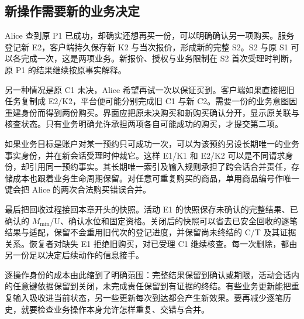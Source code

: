 
\subsection*{新操作需要新的业务决定}

Alice 查到原 P1 已成功，却确实还想再买一份，可以明确确认另一项购买。服务登记新 E2，客户端持久保存新 K2 与当次报价，形成新的完整 S2。S2 与原 S1 可以各完成一次，这是两项业务。新报价、授权与业务限制在 S2 首次受理时判断，原 P1 的结果继续按原事实解释。

另一种情况是原 C1 未决，Alice 希望再试一次以保证买到。客户端如果直接把旧任务复制成 E2/K2，平台便可能分别完成旧 C1 与新 C2。需要一份的业务意图因重建身份而得到两份购买。界面应把原未决购买和新购买确认分开，显示原关联与核查状态。只有业务明确允许承担两项各自可能成功的购买，才提交第二项。

如果业务目标是账户对某一预约只可成功一次，可以为该预约另设长期唯一的业务事实身份，并在新会话受理时仲裁它。这样 E1/K1 和 E2/K2 可以是不同请求身份，却引用同一预约事实。其长期唯一索引及输入规则承担了跨会话合并责任，存储成本也跟着业务生命周期保留。对任意可重复购买的商品，单用商品编号作唯一键会把 Alice 的两次合法购买错误合并。

最后把回收过程接回本章开头的快照。活动 E1 的快照保存未确认的完整结果、已确认的 $M_{\min}$/U、确认水位和固定资格。关闭后的快照可以省去已安全回收的逐笔结果与适配，保留不会重用旧代次的登记进度，并保留尚未终结的 C/T 及其证据关系。恢复者对缺失 E1 拒绝旧购买，对已受理 C1 继续核查。每一次删除，都由另一份足以决定后续动作的信息接手。

逐操作身份的成本由此缩到了明确范围：完整结果保留到确认或期限，活动会话内的任意键依据保留到关闭，未完成责任保留到有证据的终结。有些业务更新能把重复输入吸收进当前状态，另一些更新每次到达都会产生新效果。要再减少逐笔历史，就要检查业务操作本身允许怎样重复、交错与合并。
\FloatBarrier
